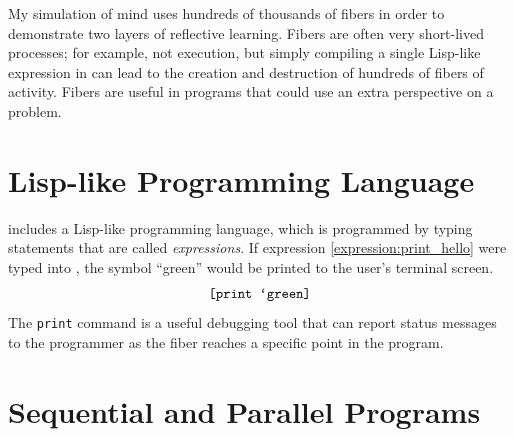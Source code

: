 My simulation of mind uses hundreds of thousands of fibers in order to
demonstrate two layers of reflective learning.  Fibers are often very
short-lived processes; for example, not execution, but simply
compiling a single Lisp-like expression in \FibR can lead to the
creation and destruction of hundreds of fibers of activity.  Fibers
are useful in programs that could use an extra perspective on a
problem.

\section{Lisp-like Programming Language}

\FibR includes a Lisp-like programming language, which is programmed
by typing statements that are called \emph{expressions}.  If
expression \ref{expression:print_hello} were typed into \FibR, the
symbol ``green'' would be printed to the user's terminal screen.
\begin{equation}
\label{expression:print_hello}
\text{\tt [print `green]}
\end{equation}
The {\tt print} command is a useful debugging tool that can report
status messages to the programmer as the fiber reaches a specific
point in the program.

\section{Sequential and Parallel Programs}

